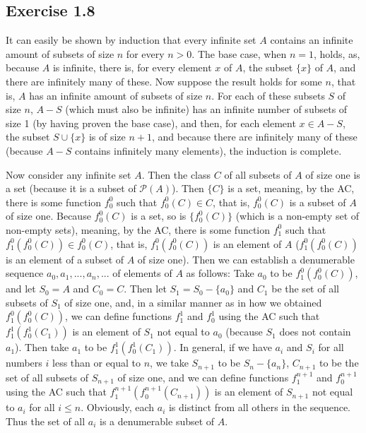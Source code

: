 \documentclass{article}
\theoremstyle{definition}
\begin{document}
\subsection*{Exercise 1.8}
It can easily be shown by induction that every infinite set $A$ contains an infinite amount of subsets of size $n$ for every $n>0$. The base case, when $n=1$, holds, as, 
because $A$ is infinite, there is, for every element $x$ of $A$, the subset $\{x\}$ of $A$, and there are infinitely many of these. Now suppose the result 
holds for some $n$, that is, $A$ has an infinite amount of subsets of size $n$. For each of these subsets $S$ of size $n$, $A-S$ (which must also be infinite) has an 
infinite number of subsets of size 1 (by having proven the base case), and then, for each element $x\in A-S$, the subset $S\cup\{x\}$ is of size $n+1$, and because 
there are infinitely many of these (because $A-S$ contains infinitely many elements), the induction is complete.

Now consider any infinite set $A$. Then the class $C$ of all subsets of $A$ of size one 
is a set (because it is a subset of $\mathcal{P}(A)$). Then
$\{C\}$ is a set, meaning, by the AC, there is some function $f^0_0$ such that $f^0_0(C)\in C$, that is, $f^0_0(C)$ is a subset of $A$ 
of size one. Because 
$f^0_0(C)$ is a set, so is $\{f^0_0(C)\}$ (which is a non-empty set of non-empty sets), 
meaning, by the AC, there is some function $f^0_1$ such that $f^0_1(f^0_0(C))\in f^0_0(C)$, that is, 
$f^0_1(f^0_0(C))$ is an element of $A$ ($f^0_1(f^0_0(C))$ is an element of a subset of $A$ of size one). 
Then we can establish a denumerable sequence $a_0,a_1,...,a_n,...$ of elements of $A$ as follows: Take 
$a_0$ to be $f^0_1(f^0_0(C))$, and let $S_0=A$ and $C_0=C$. 
Then let $S_1=S_0-\{a_0\}$ and $C_1$ be the set of all subsets of $S_1$ of size one, 
and, in a similar manner as in how we obtained $f^0_1(f^0_0(C))$, we can define functions $f^1_1$ and $f^1_0$ using the AC such that $f^1_1(f^1_0(C_1))$
is an element of $S_1$ not equal to $a_0$ (because $S_1$ does not contain $a_1$). 
Then take $a_1$ to be $f^1_1(f^1_0(C_1))$. In general, if we have $a_i$ and $S_i$ for all numbers $i$ less than or equal to 
$n$, we take $S_{n+1}$ to be $S_n-\{a_n\}$, $C_{n+1}$ to be the set of all subsets of $S_{n+1}$ of size one, 
and we can define functions $f^{n+1}_1$ and $f^{n+1}_0$ using the AC such that 
$f^{n+1}_1(f^{n+1}_0(C_{n+1}))$ is an element of $S_{n+1}$ not equal to $a_i$ for all $i\le n$. Obviously, each $a_i$ is distinct from all others in the 
sequence. Thus the set of all $a_i$ is a denumerable subset of $A$.
\end{document}
